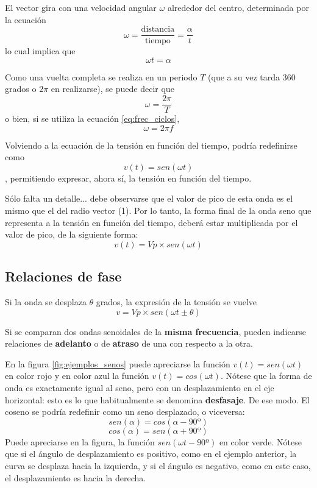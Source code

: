 El vector gira con una velocidad angular $\omega$ alrededor del centro, determinada por la ecuación $$\omega = \frac{\text{distancia}}{\text{tiempo}}= \frac{\alpha}{t}$$ lo cual implica que $$ \omega t = \alpha $$

Como una vuelta completa se realiza en un periodo $T$ (que a su vez tarda 360 grados o $2 \pi$ en realizarse), se puede decir que 
$$\omega = \frac{2\pi}{T}$$ o bien, si se utiliza la ecuación \ref{eq:frec_ciclos}, $$\omega = 2\pi f$$

Volviendo a la ecuación de la tensión en función del tiempo, podría redefinirse como $$v(t) = sen (\omega t)$$, permitiendo expresar, ahora sí, la tensión en función del tiempo.

Sólo falta un detalle... debe observarse que el valor de pico de esta onda es el mismo que el del radio vector (1). Por lo tanto, la forma final de la onda seno que representa a la tensión en función del tiempo, deberá estar multiplicada por el valor de pico, de la siguiente forma: 
\begin{equation}
	\label{eq:senoidal}
	v(t) = Vp \times sen(\omega t)
\end{equation}

\subsection{Relaciones de fase}
Si la onda se desplaza $\theta$ grados, la expresión de la tensión se vuelve 
$$v=Vp \times sen (\omega t \pm \theta ) $$

Si se comparan dos ondas senoidales de la \textbf{misma frecuencia}, pueden indicarse relaciones de \textbf{adelanto} o de \textbf{atraso} de una con respecto a la otra.

\begin{ejemplo}
	En la figura \ref{fig:ejemplos_senos} puede apreciarse la función $v(t)=sen(\omega t)$ en color rojo y en color azul la función $v(t)=cos(\omega t)$. Nótese que la forma de onda es exactamente igual al seno, pero con un desplazamiento en el eje horizontal: esto es lo que habitualmente se denomina \textbf{desfasaje}. De ese modo. El coseno se podría redefinir como un seno desplazado, o viceversa: $$ sen(\alpha) = cos(\alpha - 90º) $$ $$ cos(\alpha) = sen(\alpha + 90º) $$
	Puede apreciarse en la figura, la función $sen(\omega t -90º)$ en color verde. Nótese que si el ángulo de desplazamiento es positivo, como en el ejemplo anterior, la curva se desplaza hacia la izquierda, y si el ángulo es negativo, como en este caso, el desplazamiento es hacia la derecha.
\end{ejemplo}

